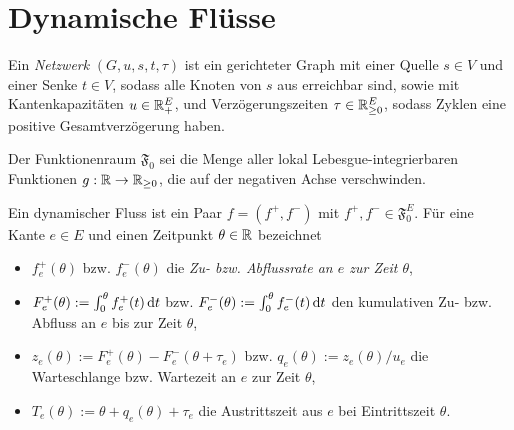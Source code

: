 \section{Dynamische Flüsse}
	\begin{definition}[Netzwerk]
		Ein \emph{Netzwerk} $(G, u, s, t, \tau)$ ist ein gerichteter Graph mit
		einer Quelle $s\in V$ und einer Senke $t\in V$, sodass alle Knoten von $s$ aus erreichbar sind,
			sowie mit Kantenkapazitäten $u\in\mathbb{R}_+^E$,
			und Verzögerungszeiten $\tau\in\mathbb{R}_{\geq 0}^E$, sodass Zyklen eine positive Gesamtverzögerung haben.
	\end{definition}

	\begin{definition}
		Der Funktionenraum $\mathfrak{F}_0$ sei die Menge aller lokal Lebesgue-integrierbaren Funktionen $g:\mathbb{R} \to \mathbb{R}_{\geq 0}$, die auf der negativen Achse verschwinden.
	\end{definition}

	\begin{definition}
		Ein dynamischer Fluss ist ein Paar $f=(f^+, f^-)$ mit $f^+, f^-\in\mathfrak{F}_0^E$.		
		Für eine Kante $e\in E$ und einen Zeitpunkt $\theta\in\mathbb{R}$ bezeichnet
		\begin{itemize}[label=$\bullet$]
			\item $f_e^+(\theta)$ bzw. $f_e^-(\theta)$ die \emph{Zu- bzw. Abflussrate an $e$ zur Zeit $\theta$},
			\item $F_e^+(\theta) := \int_0^\theta f^+_e(t) \mathop{}\!\mathrm{d} t$ bzw. $F^-_e(\theta):=\int_0^\theta f^-_e(t)\mathop{}\!\mathrm{d} t$ den kumulativen Zu- bzw. Abfluss an $e$ bis zur Zeit $\theta$,
			\item $z_e(\theta):= F_e^+(\theta) - F_e^-(\theta + \tau_e)$ bzw. $q_e(\theta):= z_e(\theta)/u_e$ die Warteschlange bzw. Wartezeit an $e$ zur Zeit $\theta$,
			\item $T_e(\theta):=\theta + q_e(\theta) + \tau_e$ die Austrittszeit aus $e$ bei Eintrittszeit $\theta$.
		\end{itemize}	
	\end{definition}

